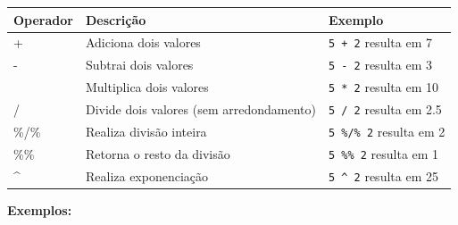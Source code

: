 \documentclass[
]{book}
\begin{document}
\begin{longtable}[]{@{}
  >{\raggedright\arraybackslash}p{}
  >{\raggedright\arraybackslash}p{}
  >{\raggedright\arraybackslash}p{}@{}}
\toprule\noalign{}
\begin{minipage}[b]{\linewidth}\raggedright
\textbf{Operador}
\end{minipage} & \begin{minipage}[b]{\linewidth}\raggedright
\textbf{Descrição}
\end{minipage} & \begin{minipage}[b]{\linewidth}\raggedright
\textbf{Exemplo}
\end{minipage} \\
\midrule\noalign{}
\endhead
\bottomrule\noalign{}
\endlastfoot
+ & Adiciona dois valores & \texttt{5\ +\ 2} resulta em 7 \\
- & Subtrai dois valores & \texttt{5\ -\ 2} resulta em 3 \\
* & Multiplica dois valores & \texttt{5\ *\ 2} resulta em 10 \\
/ & Divide dois valores (sem arredondamento) & \texttt{5\ /\ 2} resulta em 2.5 \\
\%/\% & Realiza divisão inteira & \texttt{5\ \%/\%\ 2} resulta em 2 \\
\%\% & Retorna o resto da divisão & \texttt{5\ \%\%\ 2} resulta em 1 \\
\^{} & Realiza exponenciação & \texttt{5\ \^{}\ 2} resulta em 25 \\
\end{longtable}

\textbf{Exemplos:}
\end{document}
